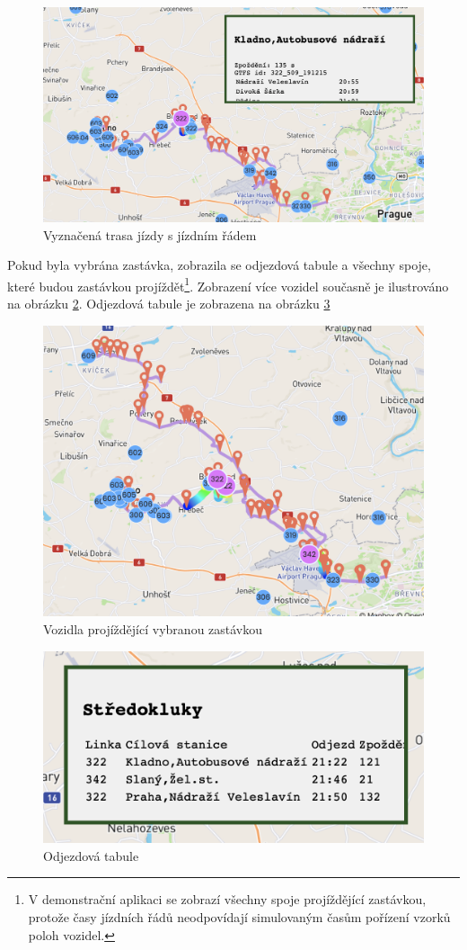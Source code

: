 \begin{figure}
   \centering
 \includegraphics[width=0.7\linewidth]{../img/kladno_aut_322.png}
 \caption{Vyznačená trasa jízdy s jízdním řádem}
 \label{fig:kladno_aut_322}
\end{figure}


\bigbreak


Pokud byla vybrána zastávka, zobrazila se odjezdová tabule a všechny spoje, které budou zastávkou projíždět\footnote{V demonstrační aplikaci se zobrazí všechny spoje projíždějící zastávkou, protože časy jízdních řádů neodpovídají simulovaným časům pořízení vzorků poloh vozidel.}. Zobrazení více vozidel současně je ilustrováno na obrázku \ref{fig:more_trips}. Odjezdová tabule je zobrazena na obrázku \ref{fig:stredokluky_table}


\begin{figure}
   \centering
 \includegraphics[width=0.7\linewidth]{../img/more_trips.png}
 \caption{Vozidla projíždějící vybranou zastávkou}
 \label{fig:more_trips}
\end{figure}


\begin{figure}
   \centering
 \includegraphics[width=0.4\linewidth]{../img/stredokluky_table.png}
 \caption{Odjezdová tabule}
 \label{fig:stredokluky_table}
\end{figure}


